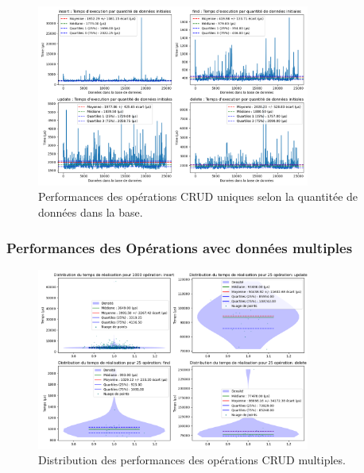 \documentclass[12pt,a4paper]{report}
\begin{document}
                \begin{figure}[H]
                    \centering
                    \includegraphics[width=0.8\textwidth]{../plots/MongoDB/replica_set_indexed/test_one_various_data.png}
                    \caption{Performances des opérations CRUD uniques selon la quantitée de données dans la base.}
                    \label{fig:mongo_replica_one_various_indexed}
                \end{figure}

            \subsubsection{Performances des Opérations avec données multiples}
                
                \begin{figure}[H]
                    \centering
                    \includegraphics[width=0.8\textwidth]{../plots/MongoDB/replica_set_indexed/global_test_many.png}
                    \caption{Distribution des performances des opérations CRUD multiples.}
                    \label{fig:mongo_replica_global_many_indexed}
                \end{figure}
\end{document}

